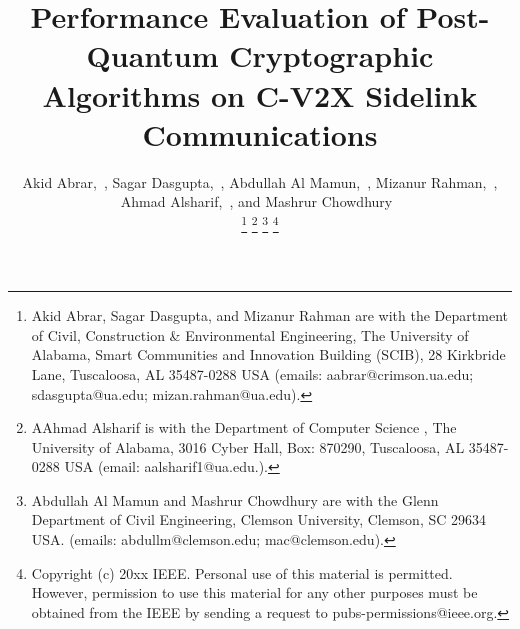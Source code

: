 \documentclass[letterpaper,journal]{IEEEtran}
\begin{document}
\title{Performance Evaluation of Post-Quantum Cryptographic Algorithms on C-V2X Sidelink Communications}

\author{%
Akid Abrar,~,
Sagar Dasgupta,~,
Abdullah Al Mamun,~,
Mizanur Rahman,~,
Ahmad Alsharif,~,
and Mashrur Chowdhury~

\thanks{Akid Abrar, Sagar Dasgupta, and Mizanur Rahman are with the Department of Civil, Construction \& Environmental Engineering, The University of Alabama, Smart Communities and Innovation Building (SCIB), 28 Kirkbride Lane, Tuscaloosa, AL 35487-0288 USA (emails: aabrar@crimson.ua.edu; sdasgupta@ua.edu; mizan.rahman@ua.edu).}
\thanks{AAhmad Alsharif is with the Department of Computer Science
, The University of Alabama, 3016 Cyber Hall, Box: 870290, Tuscaloosa, AL 35487-0288 USA (email: aalsharif1@ua.edu.).}%
\thanks{Abdullah Al Mamun and Mashrur Chowdhury are with the Glenn Department of Civil Engineering, Clemson University, Clemson, SC 29634 USA. (emails: abdullm@clemson.edu; mac@clemson.edu).}%
\thanks{Copyright (c) 20xx IEEE. Personal use of this material is permitted. However, permission to use this material for any other purposes must be obtained from the IEEE by sending a request to pubs-permissions@ieee.org.}
}




\maketitle
\end{document}
